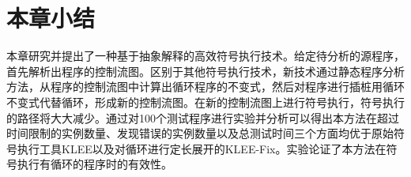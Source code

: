 \section{本章小结}
\label{sec-conclusion}
本章研究并提出了一种基于抽象解释的高效符号执行技术。给定待分析的源程序，首先解析出程序的控制流图。区别于其他符号执行技术，新技术通过静态程序分析方法，从程序的控制流图中计算出循环程序的不变式，然后对程序进行插桩用循环不变式代替循环，形成新的控制流图。在新的控制流图上进行符号执行，符号执行的路径将大大减少。通过对100个测试程序进行实验并分析可以得出本方法在超过时间限制的实例数量、发现错误的实例数量以及总测试时间三个方面均优于原始符号执行工具KLEE以及对循环进行定长展开的KLEE-Fix。实验论证了本方法在符号执行有循环的程序时的有效性。
